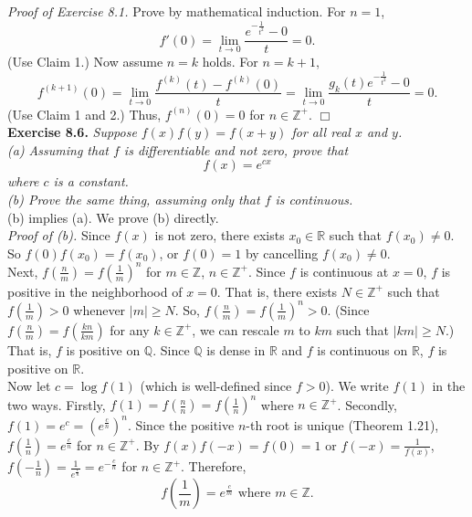 \documentclass{article}
\begin{document}
\emph{Proof of Exercise 8.1.}
Prove by mathematical induction.
For $n = 1$,
$$f'(0) = \lim_{t \rightarrow 0} \frac{e^{- \frac{1}{t^2}} - 0}{t} = 0.$$
(Use Claim 1.)
Now assume $n = k$ holds.
For $n = k + 1$,
$$f^{(k + 1)}(0)
= \lim_{t \rightarrow 0} \frac{f^{(k)}(t) - f^{(k)}(0)}{t}
= \lim_{t \rightarrow 0} \frac{g_k(t) e^{- \frac{1}{t^2}} - 0}{t} = 0.$$
(Use Claim 1 and 2.)
Thus, $f^{(n)}(0) = 0$ for $n \in \mathbb{Z}^+$.
$\Box$ \\



\textbf{Exercise 8.6.}
\emph{Suppose $f(x)f(y) = f(x + y)$ for all real $x$ and $y$. \\
(a) Assuming that $f$ is differentiable and not zero, prove that
$$f(x) = e^{cx}$$
where $c$ is a constant. \\
(b) Prove the same thing, assuming only that $f$ is continuous.} \\

(b) implies (a). We prove (b) directly. \\

\emph{Proof of (b).}
Since $f(x)$ is not zero, there exists $x_0 \in \mathbb{R}$ such that $f(x_0) \neq 0$.
So $f(0)f(x_0) = f(x_0)$, or $f(0) = 1$ by cancelling $f(x_0) \neq 0$. \\

Next, $f(\frac{n}{m}) = f(\frac{1}{m})^n$ for $m \in \mathbb{Z}$, $n \in \mathbb{Z}^{+}$.
Since $f$ is continuous at $x = 0$, $f$ is positive in the neighborhood of $x = 0$.
That is, there exists $N \in \mathbb{Z}^{+}$ such that $f(\frac{1}{m}) > 0$
whenever $|m| \geq N$.
So, $f(\frac{n}{m}) = f(\frac{1}{m})^n > 0$.
(Since $f(\frac{n}{m}) = f(\frac{kn}{km})$ for any $k \in \mathbb{Z}^{+}$,
we can rescale $m$ to $km$ such that $|km| \geq N$.)
That is, $f$ is positive on $\mathbb{Q}$.
Since $\mathbb{Q}$ is dense in $\mathbb{R}$ and $f$ is continuous on $\mathbb{R}$,
$f$ is positive on $\mathbb{R}$. \\

Now let $c = \log f(1)$ (which is well-defined since $f > 0$).
We write $f(1)$ in the two ways.
Firstly, $f(1) = f(\frac{n}{n}) = f(\frac{1}{n})^n$ where $n \in \mathbb{Z}^{+}$.
Secondly, $f(1) = e^c = (e^{\frac{c}{n}})^n$.
Since the positive $n$-th root is unique (Theorem 1.21),
$f(\frac{1}{n}) = e^{\frac{c}{n}}$ for $n \in \mathbb{Z}^{+}$.
By $f(x)f(-x) = f(0) = 1$ or $f(-x) = \frac{1}{f(x)}$,
$f(-\frac{1}{n}) = \frac{1}{e^{\frac{c}{n}}} = e^{-\frac{c}{n}}$ for $n \in \mathbb{Z}^{+}$.
Therefore,
$$f\left( \frac{1}{m} \right) = e^{\frac{c}{m}} \text{ where } m \in \mathbb{Z}.$$
\end{document}
